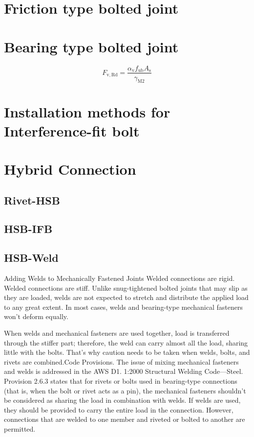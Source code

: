 \section{Friction type bolted joint}

\section{Bearing type bolted joint}


\begin{equation}
F_{\mathrm{v}, \mathrm{Rd}}=\frac{\alpha_{\mathrm{v}} f_{\mathrm{ub}} A_{\mathrm{s}}}{\gamma_{\mathrm{M} 2}}
\end{equation}



\section{Installation methods for Interference-fit bolt}

\section{Hybrid Connection}

\subsection{Rivet-HSB}

\subsection{HSB-IFB}

\subsection{HSB-Weld}
\label{sec-hsbweld}

Adding Welds to Mechanically Fastened Joints Welded connections are rigid. Welded connections are stiff. Unlike snug-tightened bolted joints that may slip as they are loaded, welds are not expected to stretch and distribute the applied load to any great extent. In most cases, welds and bearing-type mechanical fasteners won't deform equally.

When welds and mechanical fasteners are used together, load is transferred through the stiffer part; therefore, the weld can carry almost all the load, sharing little with the bolts. That's why caution needs to be taken when welds, bolts, and rivets are combined.Code Provisions. The issue of mixing mechanical fasteners and welds is addressed in the AWS D1. 1:2000 Structural Welding Code—Steel. Provision 2.6.3 states that for rivets or bolts used in bearing-type connections (that is, when the bolt or rivet acts as a pin), the mechanical fasteners shouldn't be considered as sharing the load in combination with welds. If welds are used, they should be provided to carry the entire load in the connection. However, connections that are welded to one member and riveted or bolted to another are permitted.

